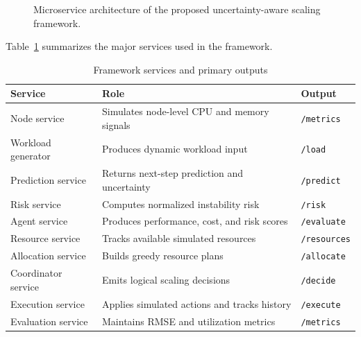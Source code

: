 \documentclass[conference]{IEEEtran}
\begin{document}
\begin{figure}[!t]
\caption{Microservice architecture of the proposed uncertainty-aware scaling framework.}
\label{fig:architecture}
\end{figure}

Table~\ref{tab:services} summarizes the major services used in the framework.

\begin{table}[!t]
\caption{Framework services and primary outputs}
\label{tab:services}
\centering
\footnotesize
\begin{tabular}{p{2.2cm} p{4.2cm} p{1.6cm}}
\toprule
\textbf{Service} & \textbf{Role} & \textbf{Output} \\
\midrule
Node service & Simulates node-level CPU and memory signals & \texttt{/metrics} \\
Workload generator & Produces dynamic workload input & \texttt{/load} \\
Prediction service & Returns next-step prediction and uncertainty & \texttt{/predict} \\
Risk service & Computes normalized instability risk & \texttt{/risk} \\
Agent service & Produces performance, cost, and risk scores & \texttt{/evaluate} \\
Resource service & Tracks available simulated resources & \texttt{/resources} \\
Allocation service & Builds greedy resource plans & \texttt{/allocate} \\
Coordinator service & Emits logical scaling decisions & \texttt{/decide} \\
Execution service & Applies simulated actions and tracks history & \texttt{/execute} \\
Evaluation service & Maintains RMSE and utilization metrics & \texttt{/metrics} \\
\bottomrule
\end{tabular}
\end{table}
\end{document}
